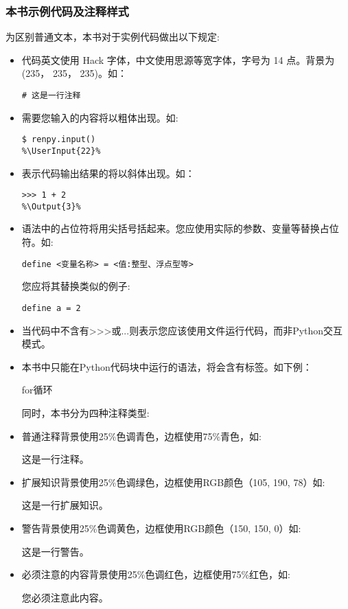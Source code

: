 \subsubsection*{本书示例代码及注释样式}
为区别普通文本，本书对于实例代码做出以下规定:
\begin{itemize}
    \item 代码英文使用 Hack 字体，中文使用思源等宽字体，字号为 14 点。背景为 (235， 235， 235)。如：
    \begin{lstlisting}[numbers=none]
# 这是一行注释
    \end{lstlisting}

    \item 需要您输入的内容将以粗体出现。如:
    \begin{lstlisting}
$ renpy.input()
%\UserInput{22}%
    \end{lstlisting}

    \item 表示代码输出结果的将以斜体出现。如：
    \begin{lstlisting}
>>> 1 + 2
%\Output{3}%
    \end{lstlisting}

    \item 语法中的占位符将用尖括号括起来。您应使用实际的参数、变量等替换占位符。如:
    \begin{lstlisting}[numbers=none]
define <变量名称> = <值:整型、浮点型等>
    \end{lstlisting}
    您应将其替换类似的例子:
    \begin{lstlisting}[numbers=none]
define a = 2
    \end{lstlisting}

    \item 当代码中不含有>>>或...则表示您应该使用文件运行代码，而非Python交互模式。

    \item 本书中只能在Python代码块中运行的语法，将会含有\PyOnly 标签。如下例：


    for循环 \PyOnly


    同时，本书分为四种注释类型:
    \item 普通注释背景使用25\%色调青色，边框使用75\%青色，如:
    \begin{Comment}
这是一行注释。
    \end{Comment}
    \item 扩展知识背景使用25\%色调绿色，边框使用RGB颜色（105, 190, 78）如:
    \begin{ExtraKnowledge}
    这是一行扩展知识。
    \end{ExtraKnowledge}
    \item 警告背景使用25\%色调黄色，边框使用RGB颜色（150, 150, 0）如:
    \begin{Warning}
    这是一行警告。
    \end{Warning}
    \item 必须注意的内容背景使用25\%色调红色，边框使用75\%红色，如:
    \begin{Attention}
    您必须注意此内容。
    \end{Attention}
\end{itemize}

